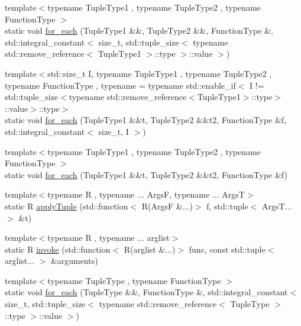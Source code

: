 \begin{DoxyCompactItemize}
\item 
{\footnotesize template$<$typename Tuple\+Type1 , typename Tuple\+Type2 , typename Function\+Type $>$ }\\static void \mbox{\hyperlink{structfakeit_1_1TupleDispatcher_a30fb1a59df83f4faaa461d3fee4b20bc}{for\+\_\+each}} (Tuple\+Type1 \&\&, Tuple\+Type2 \&\&, Function\+Type \&, std\+::integral\+\_\+constant$<$ size\+\_\+t, std\+::tuple\+\_\+size$<$ typename std\+::remove\+\_\+reference$<$ Tuple\+Type1 $>$\+::type $>$\+::value $>$)
\item 
{\footnotesize template$<$std\+::size\+\_\+t I, typename Tuple\+Type1 , typename Tuple\+Type2 , typename Function\+Type , typename  = typename std\+::enable\+\_\+if$<$            I != std\+::tuple\+\_\+size$<$typename std\+::remove\+\_\+reference$<$\+Tuple\+Type1$>$\+::type$>$\+::value$>$\+::type$>$ }\\static void \mbox{\hyperlink{structfakeit_1_1TupleDispatcher_a42566b7faaac776dc99492e7c0b973b3}{for\+\_\+each}} (Tuple\+Type1 \&\&t, Tuple\+Type2 \&\&t2, Function\+Type \&f, std\+::integral\+\_\+constant$<$ size\+\_\+t, I $>$)
\item 
{\footnotesize template$<$typename Tuple\+Type1 , typename Tuple\+Type2 , typename Function\+Type $>$ }\\static void \mbox{\hyperlink{structfakeit_1_1TupleDispatcher_a1ddb90f24aa73dd61bf2b95c5f176cd5}{for\+\_\+each}} (Tuple\+Type1 \&\&t, Tuple\+Type2 \&\&t2, Function\+Type \&f)
\item 
{\footnotesize template$<$typename R , typename ... ArgsF, typename ... ArgsT$>$ }\\static R \mbox{\hyperlink{structfakeit_1_1TupleDispatcher_ac57ede994f304c03e3982e6fa4d1ca41}{apply\+Tuple}} (std\+::function$<$ R(ArgsF \&...)$>$ f, std\+::tuple$<$ Args\+T... $>$ \&t)
\item 
{\footnotesize template$<$typename R , typename ... arglist$>$ }\\static R \mbox{\hyperlink{structfakeit_1_1TupleDispatcher_a279619fd6d6649c4d99c459a3286469a}{invoke}} (std\+::function$<$ R(arglist \&...)$>$ func, const std\+::tuple$<$ arglist... $>$ \&arguments)
\item 
{\footnotesize template$<$typename Tuple\+Type , typename Function\+Type $>$ }\\static void \mbox{\hyperlink{structfakeit_1_1TupleDispatcher_af22c1fae8c695f722da986df9af411ca}{for\+\_\+each}} (Tuple\+Type \&\&, Function\+Type \&, std\+::integral\+\_\+constant$<$ size\+\_\+t, std\+::tuple\+\_\+size$<$ typename std\+::remove\+\_\+reference$<$ Tuple\+Type $>$\+::type $>$\+::value $>$)

\end{DoxyCompactItemize}
